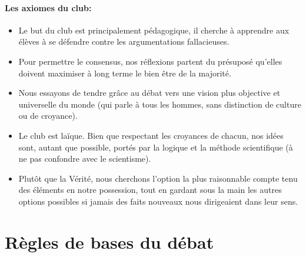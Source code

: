 \documentclass[a4paper,12pt]{article}
\begin{document}
\paragraph{Les axiomes du club:}
\begin{itemize}
 \item  Le but du club est principalement pédagogique, il cherche à apprendre aux élèves à se défendre contre les argumentations fallacieuses.
 \item  Pour permettre le consensus, nos réflexions partent du présuposé qu'elles doivent maximiser à long terme le bien être de la majorité.
 \item  Nous essayons de tendre grâce au débat vers une vision plus objective et universelle du monde (qui parle à tous les hommes, sans distinction de culture ou de croyance).
 \item  Le club est laïque. Bien que respectant les croyances de chacun, nos idées sont, autant que possible, portés par la logique et la méthode scientifique (à ne pas confondre avec le scientisme).
 \item  Plutôt que la Vérité, nous cherchons l'option la plus raisonnable compte tenu des éléments en notre possession, tout en gardant sous la main les autres options possibles si jamais des faits nouveaux nous dirigeaient dans leur sens.
\end{itemize}

\section{Règles de bases du débat}
\end{document}
